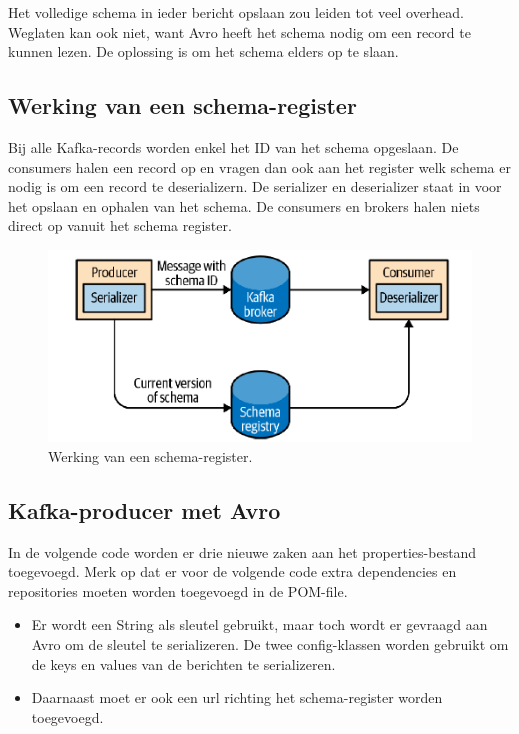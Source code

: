 \documentclass[a4paper,10pt,twoside]{report}
\begin{document}
Het volledige schema in ieder bericht opslaan zou leiden tot veel overhead. Weglaten kan ook niet, want Avro heeft het schema nodig om een record te kunnen lezen. De oplossing is om het schema elders op te slaan.

\subsection{Werking van een schema-register}

Bij alle Kafka-records worden enkel het ID van het schema opgeslaan. De consumers halen een record op en vragen dan ook aan het register welk schema er nodig is om een record te deserializern. De serializer en deserializer staat in voor het opslaan en ophalen van het schema. De consumers en brokers halen niets direct op vanuit het schema register.

\begin{figure}
	\includegraphics[width=\linewidth]{images/serializer-schema.png}
	\caption{Werking van een schema-register.}
\end{figure}

\subsection{Kafka-producer met Avro}

In de volgende code worden er drie nieuwe zaken aan het properties-bestand toegevoegd. Merk op dat er voor de volgende code extra dependencies en repositories moeten worden toegevoegd in de POM-file. 

\begin{itemize}
	\item Er wordt een String als sleutel gebruikt, maar toch wordt er gevraagd aan Avro om de sleutel te serializeren. De twee config-klassen worden gebruikt om de keys en values van de berichten te serializeren.
	\item Daarnaast moet er ook een url richting het schema-register worden toegevoegd.
\end{itemize}
\end{document}
